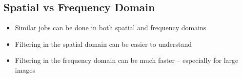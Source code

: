 \subsection*{Spatial vs Frequency Domain}

\begin{itemize}
  \item Similar jobs can be done in both spatial and frequency domains
  \item Filtering in the spatial domain can be easier to understand
  \item Filtering in the frequency domain can be much faster –
    especially for large images
\end{itemize}
